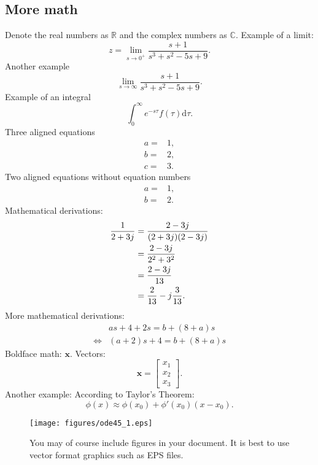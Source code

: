 \documentclass[a4paper,10pt,reqno]{amsart}
\numberwithin{equation}{section}
\newcommand{\R}{\mathbb{R}}
\newcommand{\C}{\mathbb{C}}
\newcommand{\dd}{\mathrm{d}}
\begin{document}
\subsection{More math} Denote the real numbers as $\R$ and the complex numbers
as $\C$. Example of a limit:
\begin{equation}
    z = \lim_{s\to0^+}\frac{s+1}{s^3+s^2-5s+9}.
\end{equation}
Another example
\begin{equation}
    \lim_{s\to\infty} \frac{s+1}{s^3+s^2-5s+9}.
\end{equation}
Example of an integral
\begin{equation}
    \int_0^\infty e^{-s\tau}f(\tau)\dd\tau.
\end{equation}
Three aligned equations
\begin{align}
    a =& 1,
    \\
    b =& 2,
    \\
    c =& 3.
\end{align}
Two aligned equations without equation numbers
\begin{align*}
    a =& 1,
    \\
    b =& 2.
\end{align*}
Mathematical derivations:
\begin{align}
    \frac{1}{2+3j} {}={}& \frac{2-3j}{(2+3j)(2-3j)}
    \notag\\
    {}={}& \frac{2-3j}{2^2 + 3^2}
    \notag\\
    {}={}& \frac{2-3j}{13}
    \notag\\
    {}={}&\frac{2}{13} - j\frac{3}{13}.
\end{align}
More mathematical derivations:
\begin{align*}
 & as + 4 + 2s = b + (8+a)s
\\
 \Leftrightarrow{}& (a+2)s + 4 = b + (8+a)s
\end{align*}
Boldface math: $\bm{x}$. Vectors:
\begin{equation}
\bm{x} =
    \begin{bmatrix}
    x_1
    \\
    x_2
    \\
    x_3
    \end{bmatrix}.
\end{equation}
Another example: According to Taylor's Theorem:
\begin{equation}
    \phi(x) \approx \phi(x_0) + \phi'(x_0)(x-x_0).
\end{equation}


\begin{figure}
 \centering
 \texttt{[image: figures/ode45\_1.eps]}
 \caption{You may of course include figures in your document. It is best to use vector format graphics such as EPS files.}
\end{figure}
\end{document}

